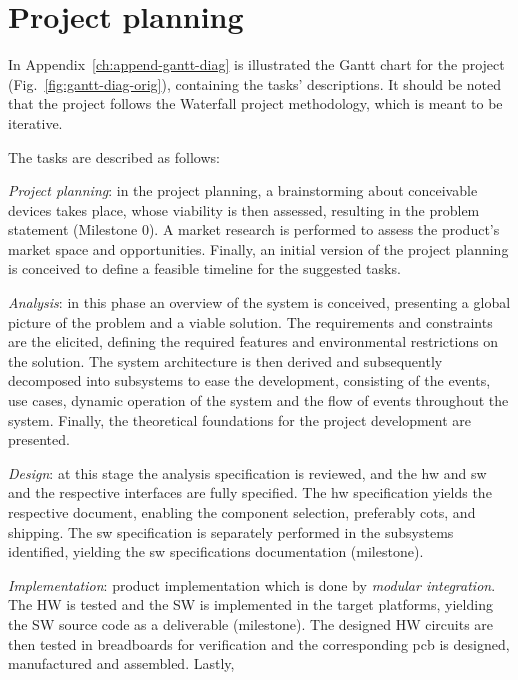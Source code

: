 \section{Project planning}%
\label{sec:project-planning}
%
In Appendix~\ref{ch:append-gantt-diag} is illustrated the Gantt chart for the
project (Fig.~\ref{fig:gantt-diag-orig}), containing the tasks' descriptions. It
should be noted that the project follows the Waterfall project
methodology, which is meant to be iterative.

The tasks are described as follows:
\begin{item-c}
\item \emph{Project planning}: in the project planning, a brainstorming about conceivable devices takes place, whose
viability is then assessed, resulting in the problem statement
(Milestone 0). A market research is performed to assess the product's market
space and opportunities. Finally, an initial version of the project planning is
conceived to define a feasible timeline for the suggested tasks.
%
\item \emph{Analysis}: in this phase an overview of the system is conceived,
  presenting a global picture of the problem and a viable solution. The
  requirements and constraints are the elicited, defining the required features
  and environmental restrictions on the solution. The system architecture is
  then derived and subsequently decomposed into subsystems to ease the
  development, consisting of the events, use cases, dynamic operation of the
  system and the flow of events throughout the system. Finally, the theoretical
  foundations for the project development are presented.
%
\item \emph{Design}: at this stage the analysis specification is reviewed, and
  the \gls{hw} and \gls{sw} and the respective interfaces are fully
  specified. The \gls{hw} specification yields the respective document, enabling
  the component selection, preferably \gls{cots}, and shipping. The \gls{sw} specification is separately performed in the
  subsystems identified, yielding the \gls{sw} specifications documentation (milestone).
%
\item \emph{Implementation}: product implementation which is done by
  \emph{modular integration}. The HW is tested and the SW is implemented in the
  target platforms, yielding the SW source code as a deliverable (milestone).
  The designed HW circuits are then tested in breadboards for verification and
  the corresponding \gls{pcb} is designed, manufactured and assembled. Lastly,

\end{item-c}
